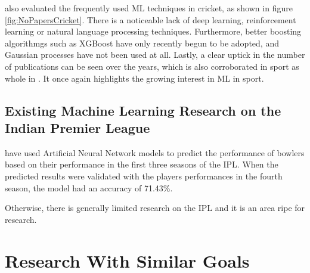 \documentclass[12pt,a4paper]{report}
\theoremstyle{definition}
\begin{document}
\citet{Wickramasinghe2022} also evaluated the frequently used ML techniques in cricket, as shown in figure \ref{fig:NoPapersCricket}. 
There is a noticeable lack of deep learning, reinforcement learning or natural language processing techniques.
Furthermore, better boosting algorithmgs such as XGBoost have only recently begun to be adopted, and Gaussian processes have not been used at all.
Lastly, a clear uptick in the number of publications can be seen over the years, which is also corroborated in sport as whole in \citet{horvat2020}.
It once again highlights the growing interest in ML in sport.

\subsection{Existing Machine Learning Research on the Indian Premier League}

\citet{Saikia2012} have used Artificial Neural Network models to predict the performance of bowlers based on their performance in the first three seasons of the IPL. 
When the predicted results were validated with the players performances in the fourth season, the model had an accuracy of 71.43\%.

Otherwise, there is generally limited research on the IPL and it is an area ripe for research.

%
%

\section{Research With Similar Goals}
\end{document}
